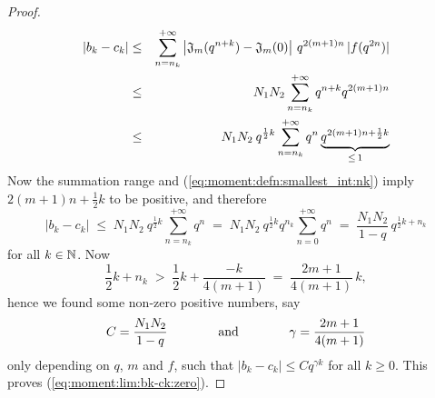 \begin{proof}
\begin{eqnarray*}
   |b_k - c_k| & \leq &  \sum_{n=n_k}^{+\infty}
         \left| \vertM \varJ{m}(q^{n+k}) - \varJ{m}(0)  \right|
         \, q^{2(m+1)n} \, |f(q^{2n})|   \\
      & \leq &  N_1 N_2  \sum_{n=n_k}^{+\infty}  q^{n+k} q^{2(m+1)n} \\
      & \leq &  N_1 N_2 \: q^{\frac{1}{2}k}  \sum_{n=n_k}^{+\infty}  q^n
                \underbrace{q^{2(m+1)n + \frac{1}{2}k}}_{\leq \,1}
\end{eqnarray*}
Now the summation range and (\ref{eq:moment:defn:smallest_int:nk}) imply
$2(m+1)n + \frac{1}{2}k$ to be positive, and therefore
$$ |b_k - c_k|  \;\leq\;   N_1 N_2 \: q^{\frac{1}{2}k} \sum_{n=n_k}^{+\infty} q^n
                \;=\;      N_1 N_2 \: q^{\frac{1}{2}k} q^{n_k} \sum_{n=0}^{+\infty} q^n
                \;=\;      \frac{N_1 N_2}{1-q} \, q^{\frac{1}{2}k + n_k} $$
for all $k\in\NN$. Now
$$ \frac{1}{2}k + n_k   \;>\;  \frac{1}{2}k + \frac{-k}{4(m+1)}
     \;=\;  \frac{2m+1}{4(m+1)} \, k,  $$
hence we found some non-zero positive numbers, say
$$ C= \frac{N_1 N_2}{1-q} \andspace{4em} \gamma = \frac{2m+1}{4(m+1)} $$
only depending on $q$, $m$ and $f$, such that $|b_k - c_k| \leq C q^{\gamma k}$
for all $k\geq 0$. This proves (\ref{eq:moment:lim:bk-ck:zero}).



\end{proof}
